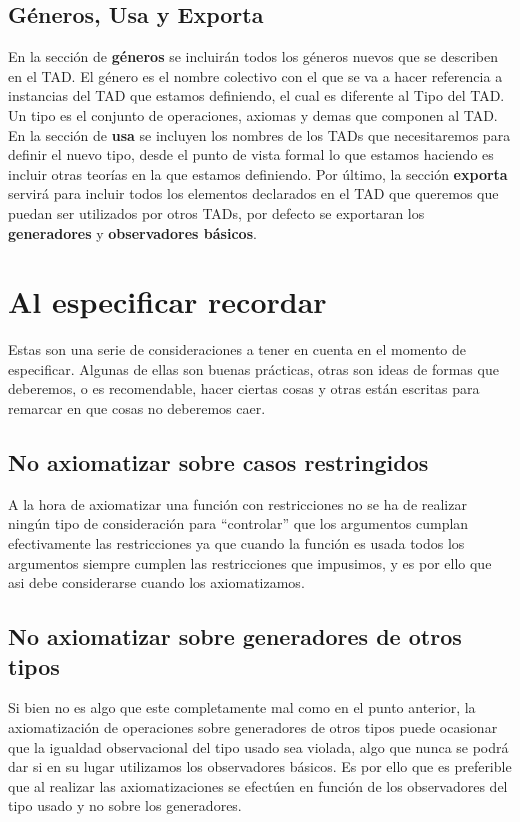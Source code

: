 \subsection{G\'eneros, Usa y Exporta}

En la secci\'on de \textbf{g\'eneros} se incluir\'an todos los g\'eneros nuevos que se describen en el TAD. El g\'enero es el nombre colectivo con el que se va a hacer referencia a instancias del TAD que estamos definiendo, el cual es diferente al Tipo del TAD. Un tipo es el conjunto de operaciones, axiomas y demas que componen al TAD. En la secci\'on de \textbf{usa} se incluyen los nombres de los TADs que necesitaremos para definir el nuevo tipo, desde el punto de vista formal lo que estamos haciendo es incluir otras teor\'ias en la que estamos definiendo. Por \'ultimo, la secci\'on \textbf{exporta} servir\'a para incluir todos los elementos declarados en el TAD que queremos que puedan ser utilizados por otros TADs, por defecto se exportaran los \textbf{generadores} y \textbf{observadores b\'asicos}.

\section{Al especificar recordar}

Estas son una serie de consideraciones a tener en cuenta en el momento de especificar. Algunas de ellas son buenas pr\'acticas, otras son ideas de formas que deberemos, o es recomendable, hacer ciertas cosas y otras est\'an escritas para remarcar en que cosas no deberemos caer.

\subsection*{No axiomatizar sobre casos restringidos}

A la hora de axiomatizar una funci\'on con restricciones no se ha de realizar ning\'un tipo de consideraci\'on para ``controlar''  que los argumentos cumplan efectivamente las restricciones ya que cuando la funci\'on es usada todos los argumentos siempre cumplen las restricciones que impusimos, y es por ello que asi debe considerarse cuando los axiomatizamos.

\subsection*{No axiomatizar sobre generadores de otros tipos}

Si bien no es algo que este completamente mal como en el punto anterior, la axiomatizaci\'on de operaciones sobre generadores de otros tipos puede ocasionar que la igualdad observacional del tipo usado sea violada, algo que nunca se podr\'a dar si en su lugar utilizamos los observadores b\'asicos. Es por ello que es preferible que al realizar las axiomatizaciones se efect\'uen en funci\'on de los observadores del tipo usado y no sobre los generadores.

